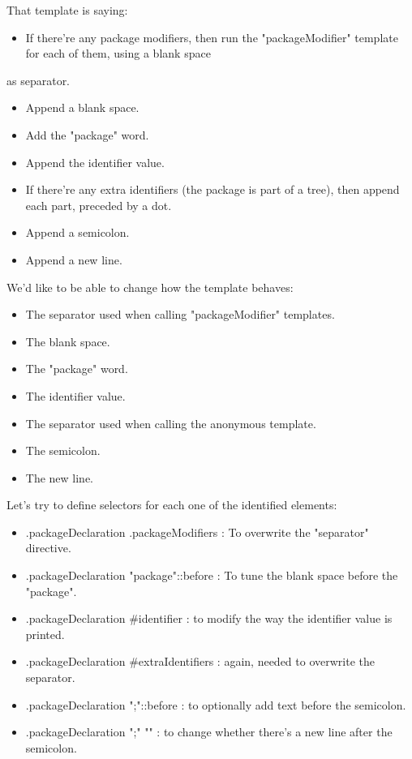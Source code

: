 \documentclass[11pt]{article}
\begin{document}
That template is saying:
\begin{itemize}
\item If there're any package modifiers, then run the "packageModifier" template for each of them, using a blank space
\end{itemize}
as separator.
\begin{itemize}
\item Append a blank space.
\item Add the "package" word.
\item Append the identifier value.
\item If there're any extra identifiers (the package is part of a tree), then append each part, preceded by a dot.
\item Append a semicolon.
\item Append a new line.
\end{itemize}

We'd like to be able to change how the template behaves:
\begin{itemize}
\item The separator used when calling "packageModifier" templates.
\item The blank space.
\item The "package" word.
\item The identifier value.
\item The separator used when calling the anonymous template.
\item The semicolon.
\item The new line.
\end{itemize}

Let's try to define selectors for each one of the identified elements:
\begin{itemize}
\item .packageDeclaration .packageModifiers : To overwrite the "separator" directive.
\item .packageDeclaration "package"::before : To tune the blank space before the "package".
\item .packageDeclaration \#identifier : to modify the way the identifier value is printed.
\item .packageDeclaration \#extraIdentifiers : again, needed to overwrite the separator.
\item .packageDeclaration ";"::before : to optionally add text before the semicolon.
\item .packageDeclaration ";" "\s*" : to change whether there's a new line after the semicolon.
\end{itemize}
\end{document}
